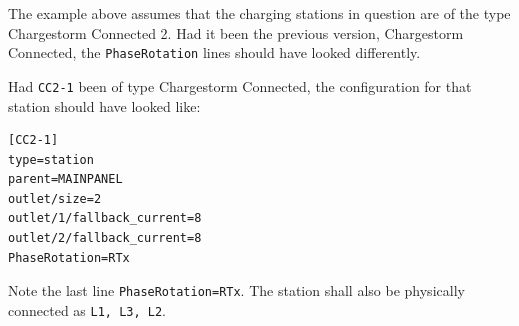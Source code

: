 \documentclass[10pt,a4paper,oneside,headings=big,headsepline]{scrreprt}
\begin{document}
The example above assumes that the charging stations in question are of the
type Chargestorm Connected 2. Had it been the previous version, Chargestorm
Connected, the \verb|PhaseRotation| lines should have looked differently.

Had \verb|CC2-1| been of type Chargestorm Connected, the configuration for
that station should have looked like:
\begin{verbatim}
[CC2-1]
type=station
parent=MAINPANEL
outlet/size=2
outlet/1/fallback_current=8
outlet/2/fallback_current=8
PhaseRotation=RTx
\end{verbatim}
Note the last line \verb|PhaseRotation=RTx|. The station shall also be
physically connected as \verb|L1, L3, L2|.
\end{document}
